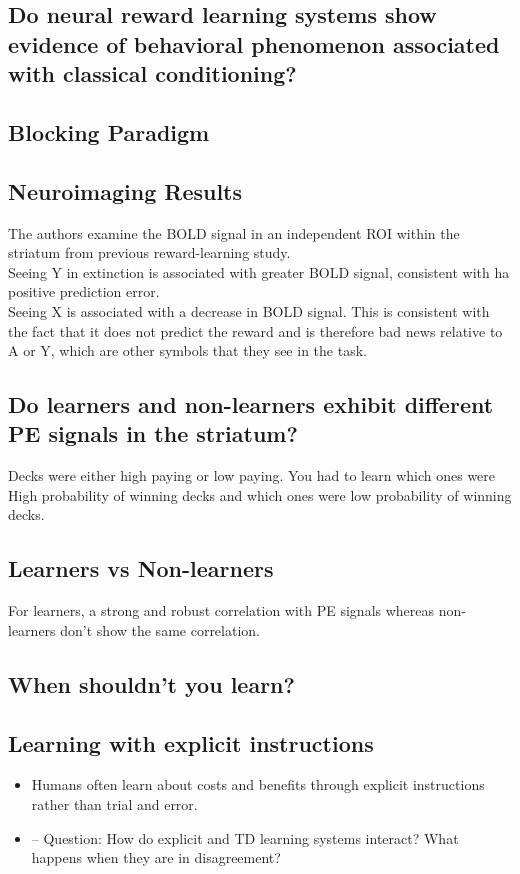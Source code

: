 \subsection{Do neural reward learning systems show
evidence of behavioral phenomenon
associated with classical conditioning?}
\subsection{Blocking Paradigm}

\subsection{Neuroimaging Results}
The authors examine the BOLD signal in an independent ROI within the striatum from previous reward-learning study.
\\Seeing Y in extinction is associated with greater BOLD signal, consistent with ha positive prediction error.
\\Seeing X is associated with a decrease in BOLD signal. This is consistent with the fact that it does not predict the reward and is therefore bad news relative to A or Y, which are other symbols that they see in the task.

\subsection{Do learners and non-learners exhibit different PE signals in the striatum?}
Decks were either high paying or low paying. You had to learn which ones were High probability of winning decks and which ones were low probability of winning decks.

\subsection{Learners vs Non-learners}
For learners, a strong and robust correlation with PE signals whereas non-learners don't show the same correlation.
\subsection{When shouldn't you learn?}

\subsection{Learning with explicit instructions}
\begin{itemize}
    \item Humans often learn about costs and benefits through explicit instructions rather than trial and error.
    \item – Question: How do explicit and TD learning systems interact? What happens when they are in disagreement?

\end{itemize}
